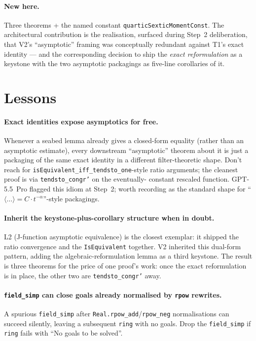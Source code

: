 \documentclass[11pt]{article}
\begin{document}
\paragraph{New here.} Three theorems + the named constant
\texttt{quarticSexticMomentConst}. The architectural contribution is
the realisation, surfaced during Step~2 deliberation, that V2's
``asymptotic'' framing was conceptually redundant against T1's
exact identity --- and the corresponding decision to ship the
\emph{exact reformulation} as a keystone with the two asymptotic
packagings as five-line corollaries of it.

\section{Lessons}

\paragraph{Exact identities expose asymptotics for free.}
Whenever a seabed lemma already gives a closed-form equality (rather
than an asymptotic estimate), every downstream ``asymptotic'' theorem
about it is just a packaging of the same exact identity in a
different filter-theoretic shape. Don't reach for
\texttt{isEquivalent\_iff\_tendsto\_one}-style ratio arguments;
the cleanest proof is via \texttt{tendsto\_congr'} on the eventually-
constant rescaled function. GPT-5.5~Pro flagged this idiom at
Step~2; worth recording as the standard shape for ``$\langle\dots
\rangle = C \cdot t^{-\alpha}$''-style packagings.

\paragraph{Inherit the keystone-plus-corollary structure when in
doubt.} L2 (J-function asymptotic equivalence) is the closest
exemplar: it shipped the ratio convergence and the
\texttt{IsEquivalent} together. V2 inherited this dual-form pattern,
adding the algebraic-reformulation lemma as a third keystone. The
result is three theorems for the price of one proof's work: once the
exact reformulation is in place, the other two are
\texttt{tendsto\_congr'} away.

\paragraph{\texttt{field\_simp} can close goals already normalised
by \texttt{rpow} rewrites.} A spurious \texttt{field\_simp} after
\texttt{Real.rpow\_add}/\texttt{rpow\_neg} normalisations can succeed
silently, leaving a subsequent \texttt{ring} with no goals. Drop the
\texttt{field\_simp} if \texttt{ring} fails with ``No goals to be
solved''.
\end{document}
